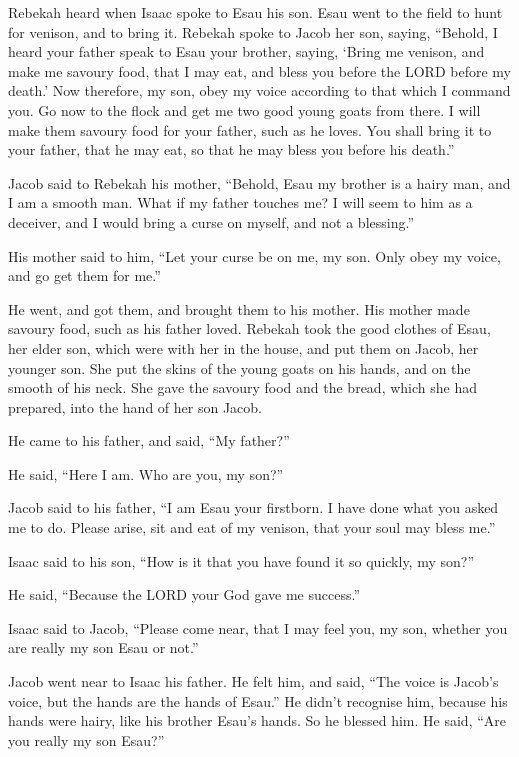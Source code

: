  Rebekah heard when Isaac spoke to Esau his son. Esau went
to the field to hunt for venison, and to bring it. 
Rebekah spoke to Jacob her son, saying, ``Behold, I heard your father
speak to Esau your brother, saying,  `Bring me venison,
and make me savoury food, that I may eat, and bless you before the LORD
before my death.'  Now therefore, my son, obey my voice
according to that which I command you.  Go now to the
flock and get me two good young goats from there. I will make them
savoury food for your father, such as he loves.  You
shall bring it to your father, that he may eat, so that he may bless you
before his death.''

 Jacob said to Rebekah his mother, ``Behold, Esau my
brother is a hairy man, and I am a smooth man.  What if
my father touches me? I will seem to him as a deceiver, and I would
bring a curse on myself, and not a blessing.''

 His mother said to him, ``Let your curse be on me, my
son. Only obey my voice, and go get them for me.''

 He went, and got them, and brought them to his mother.
His mother made savoury food, such as his father loved. 
Rebekah took the good clothes of Esau, her elder son, which were with
her in the house, and put them on Jacob, her younger son.
 She put the skins of the young goats on his hands, and
on the smooth of his neck.  She gave the savoury food and
the bread, which she had prepared, into the hand of her son Jacob.

 He came to his father, and said, ``My father?''

He said, ``Here I am. Who are you, my son?''

 Jacob said to his father, ``I am Esau your firstborn. I
have done what you asked me to do. Please arise, sit and eat of my
venison, that your soul may bless me.''

 Isaac said to his son, ``How is it that you have found
it so quickly, my son?''

He said, ``Because the LORD your God gave me success.''

 Isaac said to Jacob, ``Please come near, that I may feel
you, my son, whether you are really my son Esau or not.''

 Jacob went near to Isaac his father. He felt him, and
said, ``The voice is Jacob's voice, but the hands are the hands of
Esau.''  He didn't recognise him, because his hands were
hairy, like his brother Esau's hands. So he blessed him. 
He said, ``Are you really my son Esau?''


